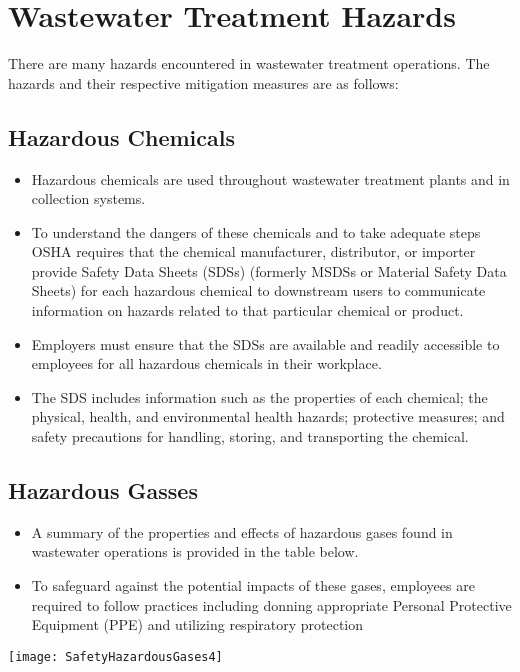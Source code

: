 \newpage

\section{Wastewater Treatment Hazards}
There are many hazards encountered in wastewater treatment operations.  The hazards and their respective mitigation measures are as follows:\\
\subsection{Hazardous Chemicals}
\begin{itemize}
\item Hazardous chemicals are used throughout wastewater treatment plants and in collection systems. 
\item To understand the dangers of these chemicals and to take adequate steps OSHA requires that the chemical manufacturer, distributor, or importer provide Safety Data Sheets (SDSs) (formerly MSDSs or Material Safety Data Sheets) for each hazardous chemical to downstream users to communicate information on hazards related to that particular chemical or product.
\item Employers must ensure that the SDSs are available and readily accessible to employees for all hazardous chemicals in their workplace.
\item The SDS includes information such as the properties of each chemical; the physical, health, and environmental health hazards; protective measures; and safety precautions for handling, storing, and transporting the chemical.\\
\end{itemize}
\subsection{Hazardous Gasses}
\begin{itemize}
\item A summary of the properties and effects of hazardous gases found in wastewater operations is provided in the table below.
\item To safeguard against the potential impacts of these gases, employees are required to follow practices including donning appropriate Personal Protective Equipment (PPE) and utilizing respiratory protection\\
\end{itemize}
\begin{center}
\texttt{[image: SafetyHazardousGases4]}\\ 
\end{center}

